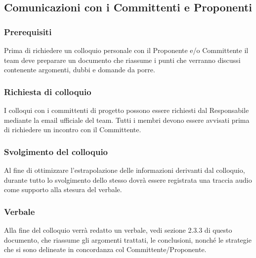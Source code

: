 \subsection{Comunicazioni con i Committenti e Proponenti}
\label{3.4}

\subsubsection{Prerequisiti}
\label{3.4.1}
Prima di richiedere un colloquio personale con il Proponente e/o Committente il team deve preparare un documento che riassume i punti che verranno discussi contenente argomenti, dubbi e domande da porre.

\subsubsection{Richiesta di colloquio}
\label{3.4.2}
I colloqui con i committenti di progetto possono essere richiesti dal Responsabile mediante la email ufficiale del team. Tutti i membri devono essere avvisati prima di richiedere un incontro con il Committente.

\subsubsection{Svolgimento del colloquio}
Al fine di ottimizzare l'estrapolazione delle informazioni derivanti dal colloquio, durante tutto lo svolgimento dello stesso dovrà essere registrata una traccia audio come supporto alla stesura del verbale.

\subsubsection{Verbale}
\label{3.4.3}
Alla fine del colloquio verrà redatto un verbale, vedi sezione 2.3.3 di questo documento, che riassume gli argomenti trattati, le conclusioni, nonché le strategie che si sono delineate in concordanza col Committente/Proponente.



\newpage




\newpage
